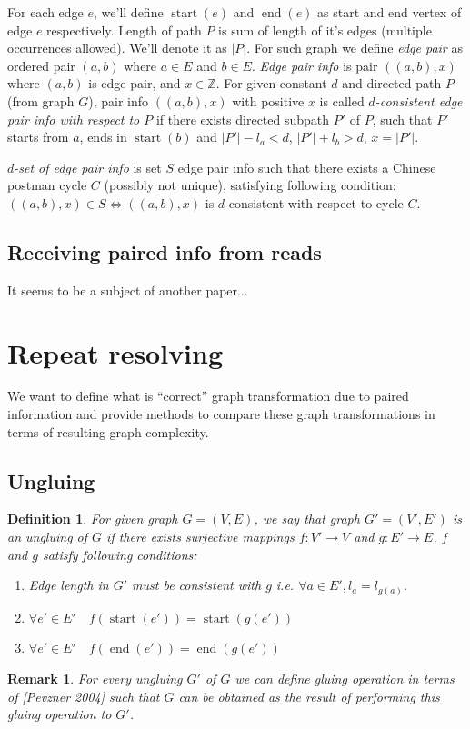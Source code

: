 \documentclass[12pt,a4paper,oneside]{article}
\newtheorem{definition}{Definition}
\newtheorem{remark}{Remark}
\begin{document}
For each edge $e$, we'll define $\mathop{start}(e)$ and $\mathop{end}(e)$ as start and end vertex of edge $e$ respectively. Length of path $P$ is sum of length of it's edges (multiple occurrences allowed). We'll denote it as $|P|$.
For such graph we define \emph{edge pair} as ordered pair $(a, b)$ where $a \in E$ and $b \in E$.
\emph{Edge pair info} is pair $((a, b), x)$ where $(a, b)$ is edge pair, and $x \in \mathbb{Z}$.
For given constant $d$ and directed path $P$ (from graph $G$), pair info $((a, b), x)$ with positive $x$ is called \emph{$d$-consistent edge pair info with respect to $P$} if there exists directed subpath $P'$ of $P$, such that $P'$ starts from $a$, ends in $\mathop{start}(b)$ and $|P'| - l_a < d$, $|P'| + l_b > d$, $x=|P'|$. 

\emph{$d$-set of edge pair info} is set $S$ edge pair info such that there exists a Chinese postman cycle $C$ (possibly not unique), satisfying following condition:
 $((a, b), x) \in S \Leftrightarrow  ((a, b), x)$ is $d$-consistent with respect to cycle $C$.
  
\subsection{Receiving paired info from reads}
It seems to be a subject of another paper...
\section{Repeat resolving}
We want to define what is ``correct'' graph transformation due to paired information and provide methods to compare these graph transformations in terms of resulting graph complexity.

\subsection{Ungluing}
\begin{definition}
For given graph $G=(V, E)$, we say that graph $G' = (V', E')$  is an \emph{ungluing} of $G$ if there exists surjective mappings $f: V' \rightarrow V$ and $g: E' \rightarrow E$, $f$ and $g$
satisfy following conditions:
\begin{enumerate}
\item Edge length in $G'$ must be consistent with $g$ i.e. $\forall a\in E', l_a = l_{g(a)}$. 
\item $\forall e'\in E'\quad f(\mathop{start}(e')) = \mathop{start}(g(e'))$
\item $\forall e'\in E'\quad f(\mathop{end}(e')) = \mathop{end}(g(e'))$
\end{enumerate}
\end{definition}
\begin{remark}
For every \emph{ungluing} $G'$ of $G$ we can define gluing operation in terms of [Pevzner 2004] such that $G$ can be obtained as the result of performing this gluing operation to $G'$.
\end{remark}
\end{document}
